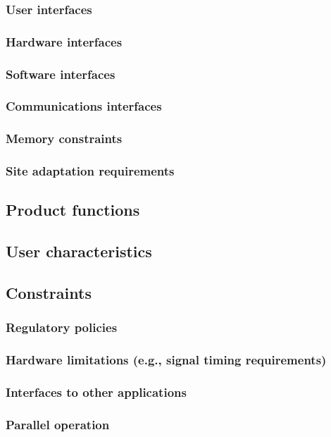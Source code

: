 \documentclass[draftclsnofoot,onecolumn,letterpaper,10pt,compsoc]{IEEEtran}
\begin{document}
		\subsubsection{User interfaces}
		\subsubsection{Hardware interfaces}
		\subsubsection{Software interfaces}
		\subsubsection{Communications interfaces}
		\subsubsection{Memory constraints}
		\subsubsection{Site adaptation requirements}
	\subsection{Product functions}
	\subsection{User characteristics}
	\subsection{Constraints}
		\subsubsection{Regulatory policies}
		\subsubsection{Hardware limitations (e.g., signal timing requirements)}
		\subsubsection{Interfaces to other applications}
		\subsubsection{Parallel operation}
\end{document}
